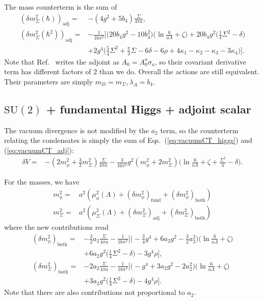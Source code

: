 \documentclass[11pt,a4paper]{article}
\newcommand\gr[1]{\mathrm{#1}}%
\begin{document}
The mass counterterm is the sum of
\begin{align}
(\delta m^2_\Sigma(\hbar))_\text{adj} =& -(4g^2 + 5 b_4) \frac{\Sigma}{4\pi a}, \\
(\delta m^2_\Sigma(\hbar^2))_\text{adj} =& -\frac{1}{16\pi^2} \Big[ \Big( 20 b_4 g^2 - 10 b^2_4 \Big)\Big( \ln\frac{6}{a \Lambda} + \zeta \Big) +20 b_4 g^2 \Big( \frac14 \Sigma^2 - \delta \Big) \nonumber \\
 &+ 2 g^4 \Big( \frac54 \Sigma^2 + \frac{\pi}{3}\Sigma - 6\delta -6\rho + 4\kappa_1 -\kappa_2 - \kappa_3 - 3\kappa_4 \Big) \Big].
\end{align}
Note that Ref.~\cite{Laine:1995np} writes the adjoint as $A_0 = A^a_0 \sigma_a$, so their covariant derivative term has different factors of $2$ than we do. Overall the actions are still equivalent. Their parameters are simply $m_D = m_\Sigma, \lambda_A = b_4$.


\subsection{$\gr{SU(2)}$ + fundamental Higgs + adjoint scalar}

The vacuum divergence is not modified by the $a_2$ term, so the counterterm relating the condensates is simply the sum of Eqs.~(\ref{eq:vacuumCT_higgs}) and (\ref{eq:vacuumCT_adj}):
\begin{align}
\delta V =& - ( 2 m^2_\phi + \frac32 m^2_\Sigma ) \frac{\Sigma}{4\pi a} - \frac{3}{16\pi^2} g^2 ( m^2_\phi + 2 m^2_\Sigma ) \Big( \ln \frac{6}{a \Lambda} +\zeta + \frac{\Sigma^2}{4} - \delta \Big).
\end{align}

For the masses, we have 
\begin{align}
m^2_\phi =& a^2(\mu^2_\phi(\Lambda) + (\delta m^2_\phi)_\text{fund}+ (\delta m^2_\phi)_\text{both} )\\
m^2_\Sigma =& a^2( \mu^2_\Sigma(\Lambda) + (\delta m^2_\Sigma)_\text{adj} + (\delta m^2_\Sigma)_\text{both} ) 
\end{align}
where the new contributions read
\begin{align}
(\delta m^2_\phi)_\text{both} =& -\frac32 a_2 \frac{\Sigma}{4\pi a} - \frac{1}{16\pi^2} \Big[ \Big( -\frac34 g^4 + 6 a_2 g^2 - \frac32 a_2^2  \Big)\Big( \ln \frac{6}{a\Lambda}+\zeta \Big) \nonumber \\ 
& + 6 a_2 g^2 \Big( \frac14 \Sigma^2 - \delta \Big) - 3g^4 \rho \Big], \\
%
(\delta m^2_\Sigma)_\text{both} =& -2 a_2 \frac{\Sigma}{4\pi a} - \frac{1}{16\pi^2}\Big[ \Big( -g^4 + 3 a_2 g^2 - 2 a_2^2 \Big)\Big( \ln\frac{6}{a \Lambda} + \zeta \Big) \nonumber \\
&+ 3 a_2 g^2 \Big( \frac14 \Sigma^2 - \delta \Big) - 4 g^4 \rho \Big].
\end{align}
Note that there are also contributions not proportional to $a_2$.
\end{document}
